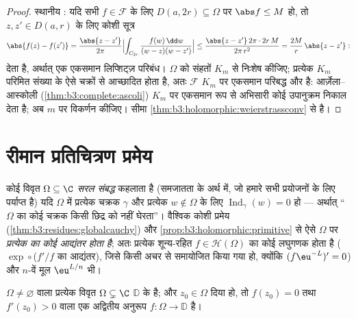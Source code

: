 \begin{proof}
स्थानीय : यदि सभी $f \in \mathcal F$ के लिए $D(a, 2r)
\subseteq \Omega$ पर $\abs f \leq M$ हो, तो
$z, z' \in D(a, r)$ के लिए कोशी सूत्र
\[
\abs{f(z) - f(z')} = \frac{\abs{z - z'}}{2\pi}
\Bigl|\int_{C_{2r}}\frac{f(w)\,\dd w}{(w-z)(w-z')}\Bigr|
\leq \frac{\abs{z - z'}\,2\pi\cdot2r\,M}{2\pi\,r^2}
= \frac{2M}{r}\,\abs{z - z'} :
\]
देता है, अर्थात् एक एकसमान लिप्शिट्ज़ परिबंध। $\Omega$ को संहतों
$K_m$ से निःशेष कीजिए; प्रत्येक $K_m$ परिमित संख्या के ऐसे चक्रों
से आच्छादित होता है, अतः $\mathcal F$ $K_m$ पर एकसमान परिबद्ध और 
है: आर्ज़ेला--आस्कोली (\cref{thm:b3:complete:ascoli}) $K_m$ पर एकसमान रूप से अभिसारी कोई
उपानुक्रम निकाल देता है; अब $m$ पर विकर्णन कीजिए। सीमा \cref{thm:b3:holomorphic:weierstrassconv} से
 है।
\end{proof}

\section{रीमान प्रतिचित्रण प्रमेय}

\begin{definition}\label{def:b3:conformal:simplyconnected}
कोई विवृत  $\Omega \subseteq \C$ \emph{सरल संबद्ध}
कहलाता है (समजातता के अर्थ में, जो हमारे सभी प्रयोजनों के लिए
पर्याप्त है) यदि $\Omega$ में प्रत्येक चक्रक $\gamma$ और प्रत्येक $w \notin \Omega$
के लिए $\operatorname{Ind}_\gamma(w) = 0$ हो --- अर्थात् ``$\Omega$ का कोई चक्रक किसी छिद्र को
नहीं घेरता''। वैश्विक कोशी प्रमेय (\cref{thm:b3:residues:globalcauchy}) और \cref{prop:b3:holomorphic:primitive} से ऐसे $\Omega$
पर \emph{प्रत्येक  का कोई आद्यंतर होता है}; अतः
प्रत्येक शून्य-रहित $f \in \mathcal H(\Omega)$ का कोई  लघुगणक होता है
($\exp\circ$($f'/f$ का आद्यंतर), जिसे किसी अचर से समायोजित किया गया हो,
क्योंकि $(f\eu^{-L})' = 0$) और  $n$-वें मूल $\eu^{L/n}$
भी।
\end{definition}

\begin{theorem}[रीमान प्रतिचित्रण प्रमेय]
\label{thm:b3:conformal:rmt}
$\Omega
\neq \varnothing$ वाला प्रत्येक  विवृत $\Omega \subsetneq \C$ $\mathbb D$ के 
है; और $z_0 \in \Omega$ दिया हो, तो $f(z_0) = 0$ तथा $f'(z_0) >
0$ वाला एक अद्वितीय अनुरूप
$f \colon
\Omega \to \mathbb D$ है।
\end{theorem}


